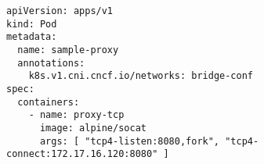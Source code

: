 \begin{lstfloat}
\begin{lstlisting}[style=mybashstyle,
caption={Ukázka konfigurace podu s Proxy},
label={sample:proxy}
]
apiVersion: apps/v1
kind: Pod
metadata:
  name: sample-proxy
  annotations:
    k8s.v1.cni.cncf.io/networks: bridge-conf
spec:
  containers:
    - name: proxy-tcp
      image: alpine/socat
      args: [ "tcp4-listen:8080,fork", "tcp4-connect:172.17.16.120:8080" ]
\end{lstlisting}
\end{lstfloat}
